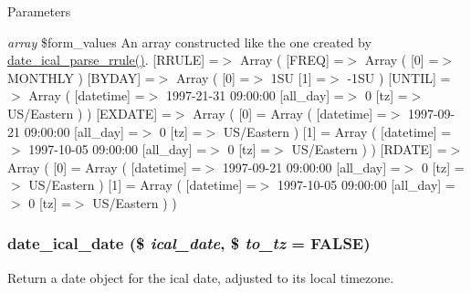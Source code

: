 \begin{DoxyParams}{Parameters}
\item[{\em array}]\$form\_\-values An array constructed like the one created by \hyperlink{date__api__ical_8inc_adaf397fd219714e7a7fd430e179ee592}{date\_\-ical\_\-parse\_\-rrule()}. \mbox{[}RRULE\mbox{]} =$>$ Array ( \mbox{[}FREQ\mbox{]} =$>$ Array ( \mbox{[}0\mbox{]} =$>$ MONTHLY ) \mbox{[}BYDAY\mbox{]} =$>$ Array ( \mbox{[}0\mbox{]} =$>$ 1SU \mbox{[}1\mbox{]} =$>$ -\/1SU ) \mbox{[}UNTIL\mbox{]} =$>$ Array ( \mbox{[}datetime\mbox{]} =$>$ 1997-\/21-\/31 09:00:00 \mbox{[}all\_\-day\mbox{]} =$>$ 0 \mbox{[}tz\mbox{]} =$>$ US/Eastern ) ) \mbox{[}EXDATE\mbox{]} =$>$ Array ( \mbox{[}0\mbox{]} = Array ( \mbox{[}datetime\mbox{]} =$>$ 1997-\/09-\/21 09:00:00 \mbox{[}all\_\-day\mbox{]} =$>$ 0 \mbox{[}tz\mbox{]} =$>$ US/Eastern ) \mbox{[}1\mbox{]} = Array ( \mbox{[}datetime\mbox{]} =$>$ 1997-\/10-\/05 09:00:00 \mbox{[}all\_\-day\mbox{]} =$>$ 0 \mbox{[}tz\mbox{]} =$>$ US/Eastern ) ) \mbox{[}RDATE\mbox{]} =$>$ Array ( \mbox{[}0\mbox{]} = Array ( \mbox{[}datetime\mbox{]} =$>$ 1997-\/09-\/21 09:00:00 \mbox{[}all\_\-day\mbox{]} =$>$ 0 \mbox{[}tz\mbox{]} =$>$ US/Eastern ) \mbox{[}1\mbox{]} = Array ( \mbox{[}datetime\mbox{]} =$>$ 1997-\/10-\/05 09:00:00 \mbox{[}all\_\-day\mbox{]} =$>$ 0 \mbox{[}tz\mbox{]} =$>$ US/Eastern ) ) \end{DoxyParams}
\hypertarget{date__api__ical_8inc_a8b0b84eff1d472110d9152574b1b390e}{
\subsubsection[{date\_\-ical\_\-date}]{\setlength{\rightskip}{0pt plus 5cm}date\_\-ical\_\-date (\$ {\em ical\_\-date}, \/  \$ {\em to\_\-tz} = {\ttfamily FALSE})}}
\label{date__api__ical_8inc_a8b0b84eff1d472110d9152574b1b390e}
Return a date object for the ical date, adjusted to its local timezone.


